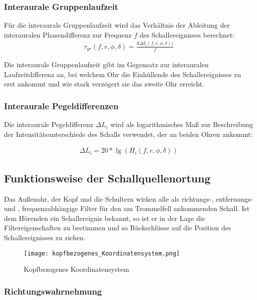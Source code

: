 \subsubsection{Interaurale Gruppenlaufzeit}
Für die interaurale Gruppenlaufzeit wird das Verhältnis der Ableitung der interauralen Phasendifferenz zur Frequenz $f$ des Schallereignisses berechnet: 
\begin{align}
\tau_{gr}(f,r,\phi,\delta) = \frac{d\Delta\delta_i(f,r,\phi,\delta))}{f}
\end{align}

Die interaurale Gruppenlaufzeit gibt im Gegensatz zur interauralen Laufzeitdifferenz an, bei welchem Ohr die Einhüllende des Schallereignisses zu erst ankommt und wie stark verzögert sie das zweite Ohr erreicht. 


\subsubsection{Interaurale Pegeldifferenzen}

Die interaurale Pegeldifferenz $\Delta L_i$ wird als logarithmisches Maß zur Beschreibung der Intensitätsunterschiede des Schalls verwendet, der an beiden Ohren ankommt: 

\begin{align}
\Delta L_i = 20* \lg(H_i(f,r,\phi,\delta)) 
\end{align}


\subsection{Funktionsweise der Schallquellenortung}

Das Außenohr, der Kopf und die Schultern wirken alle als richtungs-, entfernungs- und , frequenzabhängige Filter für den am Trommelfell ankommenden Schall. Ist dem Hörenden ein Schallereignis bekannt, so ist er in der Lage die Filtereigenschaften zu bestimmen und so Rückschlüsse auf die Position des Schallereignisses zu ziehen.

\begin{figure}[H]
\centering
\texttt{[image: kopfbezogenes\_Koordinatensystem.png]}
\caption{Kopfbezogenes Koordinatensystem}
\label{fig:Kopfbezogenes_Koordinatensystem}
\end{figure}

\subsubsection{Richtungswahrnehmung}

